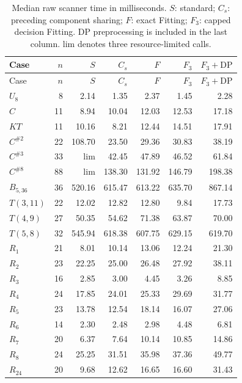 \begin{longtable}{@{}lrrrrrr@{}}
\caption{Median raw scanner time in milliseconds. $S$: standard; $C_s$: preceding component sharing; $F$: exact Fitting; $F_3$: capped decision Fitting. DP preprocessing is included in the last column. $\mathrm{lim}$ denotes three resource-limited calls.}\label{tab:all-timings}\\
\toprule Case & $n$ & $S$ & $C_s$ & $F$ & $F_3$ & $F_3+\mathrm{DP}$\\\midrule
\endfirsthead
\toprule Case & $n$ & $S$ & $C_s$ & $F$ & $F_3$ & $F_3+\mathrm{DP}$\\\midrule
\endhead
\bottomrule\endfoot
$U_8$ & 8 & 2.14 & 1.35 & 2.37 & 1.45 & 2.28\\
$C$ & 11 & 8.94 & 10.04 & 12.03 & 12.53 & 17.18\\
$KT$ & 11 & 10.16 & 8.21 & 12.44 & 14.51 & 17.91\\
$C^{\#2}$ & 22 & 108.70 & 23.50 & 29.36 & 30.83 & 38.19\\
$C^{\#3}$ & 33 & $\mathrm{lim}$ & 42.45 & 47.89 & 46.52 & 61.84\\
$C^{\#8}$ & 88 & $\mathrm{lim}$ & 138.30 & 131.92 & 146.79 & 198.38\\
$B_{5,36}$ & 36 & 520.16 & 615.47 & 613.22 & 635.70 & 867.14\\
$T(3,11)$ & 22 & 12.02 & 12.82 & 12.80 & 9.84 & 17.73\\
$T(4,9)$ & 27 & 50.35 & 54.62 & 71.38 & 63.87 & 70.00\\
$T(5,8)$ & 32 & 545.94 & 618.38 & 607.75 & 629.15 & 619.70\\
$R_{1}$ & 21 & 8.01 & 10.14 & 13.06 & 12.24 & 21.30\\
$R_{2}$ & 23 & 22.25 & 25.00 & 26.48 & 27.92 & 38.11\\
$R_{3}$ & 16 & 2.85 & 3.00 & 4.45 & 3.26 & 8.85\\
$R_{4}$ & 24 & 17.85 & 24.01 & 25.33 & 29.69 & 31.77\\
$R_{5}$ & 23 & 13.78 & 12.54 & 18.14 & 16.07 & 27.06\\
$R_{6}$ & 14 & 2.30 & 2.48 & 2.98 & 4.48 & 6.81\\
$R_{7}$ & 20 & 6.37 & 7.64 & 10.14 & 10.85 & 14.86\\
$R_{8}$ & 24 & 25.25 & 31.51 & 35.98 & 37.36 & 49.77\\
$R_{24}$ & 20 & 9.68 & 12.62 & 16.65 & 16.60 & 31.43\\
\end{longtable}
